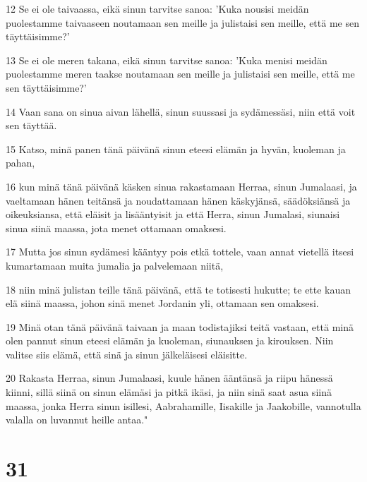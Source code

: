 \par 12 Se ei ole taivaassa, eikä sinun tarvitse sanoa: 'Kuka nousisi meidän puolestamme taivaaseen noutamaan sen meille ja julistaisi sen meille, että me sen täyttäisimme?'
\par 13 Se ei ole meren takana, eikä sinun tarvitse sanoa: 'Kuka menisi meidän puolestamme meren taakse noutamaan sen meille ja julistaisi sen meille, että me sen täyttäisimme?'
\par 14 Vaan sana on sinua aivan lähellä, sinun suussasi ja sydämessäsi, niin että voit sen täyttää.
\par 15 Katso, minä panen tänä päivänä sinun eteesi elämän ja hyvän, kuoleman ja pahan,
\par 16 kun minä tänä päivänä käsken sinua rakastamaan Herraa, sinun Jumalaasi, ja vaeltamaan hänen teitänsä ja noudattamaan hänen käskyjänsä, säädöksiänsä ja oikeuksiansa, että eläisit ja lisääntyisit ja että Herra, sinun Jumalasi, siunaisi sinua siinä maassa, jota menet ottamaan omaksesi.
\par 17 Mutta jos sinun sydämesi kääntyy pois etkä tottele, vaan annat vietellä itsesi kumartamaan muita jumalia ja palvelemaan niitä,
\par 18 niin minä julistan teille tänä päivänä, että te totisesti hukutte; te ette kauan elä siinä maassa, johon sinä menet Jordanin yli, ottamaan sen omaksesi.
\par 19 Minä otan tänä päivänä taivaan ja maan todistajiksi teitä vastaan, että minä olen pannut sinun eteesi elämän ja kuoleman, siunauksen ja kirouksen. Niin valitse siis elämä, että sinä ja sinun jälkeläisesi eläisitte.
\par 20 Rakasta Herraa, sinun Jumalaasi, kuule hänen ääntänsä ja riipu hänessä kiinni, sillä siinä on sinun elämäsi ja pitkä ikäsi, ja niin sinä saat asua siinä maassa, jonka Herra sinun isillesi, Aabrahamille, Iisakille ja Jaakobille, vannotulla valalla on luvannut heille antaa."

\chapter{31}

